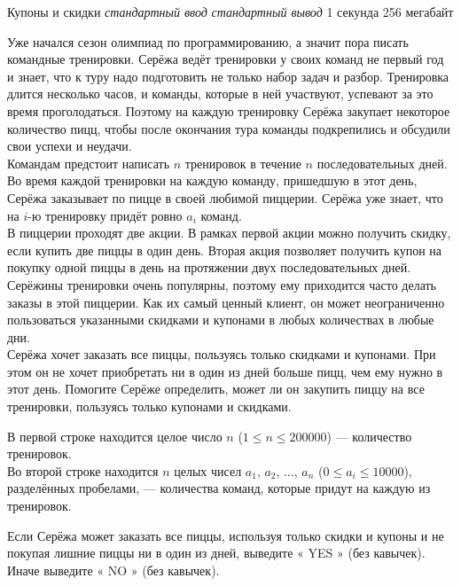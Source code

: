 \begin{problem}%
{Купоны и скидки}%
{\textsl{стандартный ввод}}%
{\textsl{стандартный вывод}}%
{1 секунда}%
{256 мегабайт}{}

Уже начался сезон олимпиад по программированию, а значит пора писать командные тренировки. Серёжа ведёт тренировки у своих команд не первый год и знает, что к туру надо подготовить не только набор задач и разбор. Тренировка длится несколько часов, и команды, которые в ней участвуют, успевают за это время проголодаться. Поэтому на каждую тренировку Серёжа закупает некоторое количество пицц, чтобы после окончания тура команды подкрепились и обсудили свои успехи и неудачи.\\

Командам предстоит написать $n$ тренировок в течение $n$ последовательных дней. Во время каждой тренировки на каждую команду, пришедшую в этот день, Серёжа заказывает по пицце в своей любимой пиццерии. Серёжа уже знает, что на $i$-ю тренировку придёт ровно $a_i$ команд.\\

В пиццерии проходят две акции. В рамках первой акции можно получить скидку, если купить две пиццы в один день. Вторая акция позволяет получить купон на покупку одной пиццы в день на протяжении двух последовательных дней.\\

Серёжины тренировки очень популярны, поэтому ему приходится часто делать заказы в этой пиццерии. Как их самый ценный клиент, он может неограниченно пользоваться указанными скидками и купонами в любых количествах в любые дни.\\

Серёжа хочет заказать все пиццы, пользуясь только скидками и купонами. При этом он не хочет приобретать ни в один из дней больше пицц, чем ему нужно в этот день. Помогите Серёже определить, может ли он закупить пиццу на все тренировки, пользуясь только купонами и скидками.

\InputFile

В первой строке находится целое число $n$ ($1 \le n \le 200000$) — количество тренировок.\\

Во второй строке находится $n$ целых чисел $a_1$, $a_2$, ..., $a_n$ ($0 \le a_i \le 10000$), разделённых пробелами, — количества команд, которые придут на каждую из тренировок.

\OutputFile

Если Серёжа может заказать все пиццы, используя только скидки и купоны и не покупая лишние пиццы ни в один из дней, выведите « YES » (без кавычек). Иначе выведите « NO » (без кавычек).


\end{problem}

